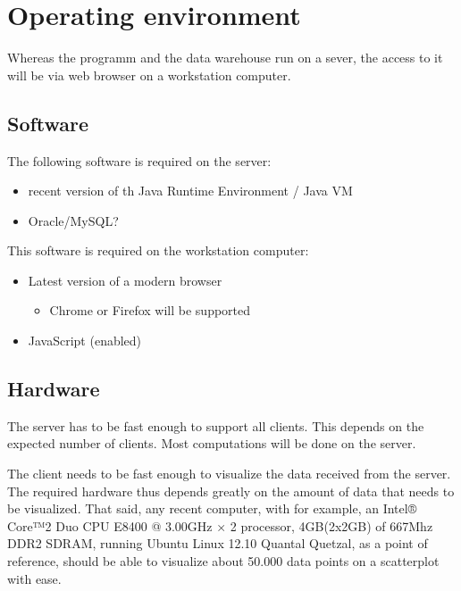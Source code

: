 \section{Operating environment}


Whereas the programm and the data warehouse run on a sever, 
the access to it will be via web browser on a workstation computer.

\subsection{Software}
The following software is required on the server:
\begin{itemize}
  \item recent version of th Java Runtime Environment / Java VM  %
  \item Oracle/MySQL?
\end{itemize}

This software is required on the workstation computer:
\begin{itemize}
  \item Latest version of a modern browser
  \begin{itemize}
    \item Chrome or Firefox will be supported
  \end{itemize}
  \item JavaScript (enabled)
\end{itemize}


\subsection{Hardware}

The server has to be fast enough to support all clients. This depends on
the expected number of clients. Most computations will be done on the server.

The client needs to be fast enough to visualize the data received from the server. 
The required hardware thus depends greatly on the amount of data that needs to be 
visualized. That said, any recent computer, with for example, 
an Intel® Core™2 Duo CPU E8400 @ 3.00GHz × 2 processor, 
4GB(2x2GB) of 667Mhz DDR2 SDRAM, running Ubuntu Linux 12.10 Quantal Quetzal, 
as a point of reference, should be able to visualize about 50.000 
data points on a scatterplot with ease.


